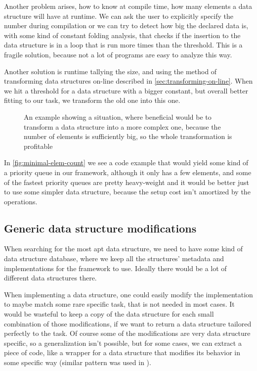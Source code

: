 \documentclass[a4paper,11pt]{article}
\begin{document}
		Another problem arises, how to know at compile time, how many elements a data structure will have at
		runtime. We can ask the user to explicitly specify the number during compilation or we can try to
		detect how big the declared data is, with some kind of constant folding analysis, that checks if the
		insertion to the data structure is in a loop that is run more times than the threshold. This is a fragile
		solution, because not a lot of programs are easy to analyze this way.

		Another solution is runtime tallying the size, and using the method of transforming data structures
		on-line described in \autoref{sec:transforming-on-line}. When we hit a threshold for a data structure
		with a bigger constant, but overall better fitting to our task, we transform the old one into this one.

		\begin{figure}
			

			\caption{An example showing a situation, where beneficial would be to transform a data structure
				into a more complex one, because the number of elements is sufficiently big, so the
				whole transformation is profitable}

			\label{fig:minimal-elem-count}
		\end{figure}

        In \autoref{fig:minimal-elem-count} we see a code example that would yield some kind of a priority queue in our
        framework, although it only has a few elements, and some of the fastest priority queues are pretty heavy-weight
        and it would be better just to use some simpler data structure, because the setup cost isn't amortized by the
        operations.

	\subsection{Generic data structure modifications} \label{sub:gdsm}

		When searching for the most apt data structure, we need to have some kind of data structure database,
		where we keep all the structures' metadata and implementations for the framework to use. Ideally there
		would be a lot of different data structures there.

		When implementing a data structure, one could easily modify the implementation to maybe match some rare
		specific task, that is not needed in most cases. It would be wasteful to keep a copy of the data
		structure for each small combination of those modifications, if we want to return a data structure
		tailored perfectly to the task. Of course some of the modifications are very data structure specific, so
		a generalization isn't possible, but for some cases, we can extract a piece of code, like a wrapper for
        a data structure that modifies its behavior in some specific way (similar pattern was used in
        \cite{Okasaki}).
\end{document}
